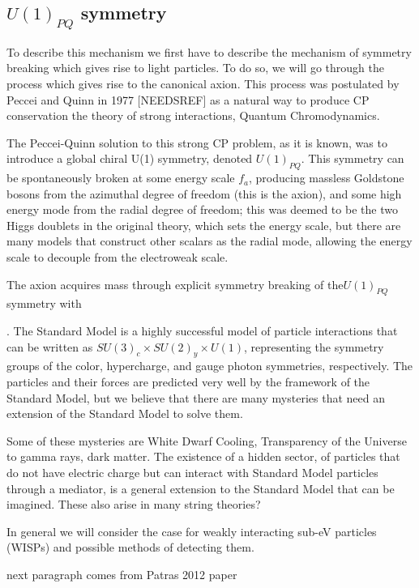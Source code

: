 \documentclass[11pt]{book}
\begin{document}
\subsection{$U(1)_{PQ}$ symmetry}

To describe this mechanism we first have to describe the mechanism of symmetry breaking which gives rise to light particles. To do so, we will go through the process which gives rise to the canonical axion. This process was postulated by Peccei and Quinn in 1977 [NEEDSREF] as a natural way to produce CP conservation the theory of strong interactions, Quantum Chromodynamics. 

The Peccei-Quinn solution to this strong CP problem, as it is known, was to introduce a global chiral U(1) symmetry, denoted $U(1)_{PQ}$. This symmetry can be spontaneously broken at some energy scale $f_a$, producing massless Goldstone bosons from the azimuthal degree of freedom (this is the axion), and some high energy mode from the radial degree of freedom; this was deemed to be the two Higgs doublets in the original theory, which sets the energy scale, but there are many models that construct other scalars as the radial mode, allowing the energy scale to decouple from the electroweak scale.

The axion acquires mass through explicit symmetry breaking of the$U(1)_{PQ}$ symmetry with 



.
The Standard Model is a highly successful model of particle interactions that can be written as $SU(3)_c \times SU(2)_y \times U(1)$, representing the symmetry groups of the color, hypercharge, and gauge photon symmetries, respectively. The particles and their forces are predicted very well by the framework of the Standard Model, but we believe that there are many mysteries that need an extension of the Standard Model to solve them.

Some of these mysteries are White Dwarf Cooling, Transparency of the Universe to gamma rays, dark matter. The existence of a hidden sector, of particles that do not have electric charge but can interact with Standard Model particles through a mediator, is a general extension to the Standard Model that can be imagined. These also arise in many string theories?

In general we will consider the case for weakly interacting sub-eV particles (WISPs) and possible methods of detecting them.

{\color{blue} next paragraph comes from Patras 2012 paper}
\end{document}
